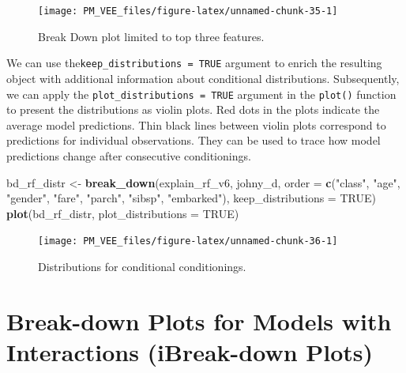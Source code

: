 \documentclass[12pt,]{krantz}
\newenvironment{Shaded}{\begin{snugshade}}{\end{snugshade}}
\newcommand{\DataTypeTok}[1]{\textcolor[rgb]{0.13,0.29,0.53}{#1}}
\newcommand{\KeywordTok}[1]{\textcolor[rgb]{0.13,0.29,0.53}{\textbf{#1}}}
\newcommand{\NormalTok}[1]{#1}
\newcommand{\OtherTok}[1]{\textcolor[rgb]{0.56,0.35,0.01}{#1}}
\newcommand{\StringTok}[1]{\textcolor[rgb]{0.31,0.60,0.02}{#1}}
\begin{document}
\begin{figure}

{\centering \texttt{[image: PM\_VEE\_files/figure-latex/unnamed-chunk-35-1]} 

}

\caption{Break Down plot limited to top three features.}\label{fig:unnamed-chunk-35}
\end{figure}

We can use the\texttt{keep\_distributions\ =\ TRUE} argument to enrich the resulting object with additional information about conditional distributions. Subsequently, we can apply the \texttt{plot\_distributions\ =\ TRUE} argument in the \texttt{plot()} function to present the distributions as violin plots. Red dots in the plots indicate the average model predictions. Thin black lines between violin plots correspond to predictions for individual observations. They can be used to trace how model predictions change after consecutive conditionings.

\begin{Shaded}
\begin{Highlighting}[]
\NormalTok{bd_rf_distr <-}\StringTok{ }\KeywordTok{break_down}\NormalTok{(explain_rf_v6,}
\NormalTok{                 johny_d,}
                 \DataTypeTok{order =} \KeywordTok{c}\NormalTok{(}\StringTok{"class"}\NormalTok{, }\StringTok{"age"}\NormalTok{, }\StringTok{"gender"}\NormalTok{, }\StringTok{"fare"}\NormalTok{, }\StringTok{"parch"}\NormalTok{, }\StringTok{"sibsp"}\NormalTok{, }\StringTok{"embarked"}\NormalTok{),}
                 \DataTypeTok{keep_distributions =} \OtherTok{TRUE}\NormalTok{)}
\KeywordTok{plot}\NormalTok{(bd_rf_distr, }\DataTypeTok{plot_distributions =} \OtherTok{TRUE}\NormalTok{) }
\end{Highlighting}
\end{Shaded}

\begin{figure}

{\centering \texttt{[image: PM\_VEE\_files/figure-latex/unnamed-chunk-36-1]} 

}

\caption{Distributions for conditional conditionings.}\label{fig:unnamed-chunk-36}
\end{figure}

\hypertarget{iBreakDown}{%
\section{Break-down Plots for Models with Interactions (iBreak-down Plots)}\label{iBreakDown}}
\end{document}
